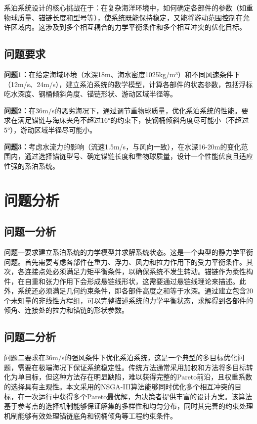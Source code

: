 \documentclass[withoutpreface,bwprint]{cumcmthesis}
\begin{document}
系泊系统设计的核心挑战在于：在复杂海洋环境中，如何确定各部件的参数（如重物球质量、锚链长度和型号等），使系统既能保持稳定，又能将游动范围控制在允许区域内。这涉及到多个相互耦合的力学平衡条件和多个相互冲突的优化目标。


\subsection{问题要求}

\textbf{问题1：}在给定海域环境（水深18m、海水密度1025kg/m³）和不同风速条件下（12m/s、24m/s），建立系泊系统的数学模型，计算各部件的状态参数，包括浮标吃水深度、钢桶倾斜角度、锚链形状、游动区域半径等。

\textbf{问题2：}在36m/s的恶劣海况下，通过调节重物球质量，优化系泊系统的性能。要求在满足锚链与海床夹角不超过16°的约束下，使钢桶倾斜角度尽可能小（不超过5°），游动区域半径尽可能小。

\textbf{问题3：}考虑水流力的影响（流速1.5m/s，与风向一致），在水深16-20m的变化范围内，通过选择锚链型号、确定锚链长度和重物球质量，设计一个性能优良且适应性强的系泊系统。


\section{问题分析}
\subsection{问题一分析}
问题一要求建立系泊系统的力学模型并求解系统状态。这是一个典型的静力学平衡问题。首先需要考虑各部件在重力、浮力、风力和拉力作用下的受力平衡条件。其次，各连接点处必须满足力矩平衡条件，以确保系统不发生转动。锚链作为柔性构件，在自重和张力作用下会形成悬链线形状，这需要通过悬链线理论来描述。此外，系统还必须满足几何约束条件，即各部件高度之和等于水深。通过建立包含20个未知量的非线性方程组，可以完整描述系统的力学平衡状态，求解得到各部件的倾角、连接处的拉力和锚链的形状参数。

\subsection{问题二分析}	
问题二要求在36m/s的强风条件下优化系泊系统，这是一个典型的多目标优化问题，需要在极端海况下保证系统稳定性。传统方法通常采用加权和方法将多目标转化为单目标，但这种方法存在明显缺陷，难以获得完整的Pareto前沿，且权重系数的选择具有主观性。本文采用的NSGA-III算法能够同时优化多个相互冲突的目标，在一次运行中获得多个Pareto最优解，为决策者提供丰富的设计方案。该算法基于参考点的选择机制能够保证解集的多样性和均匀分布，同时其完善的约束处理机制能够有效处理锚链底角和钢桶倾角等工程约束条件。
\end{document}
